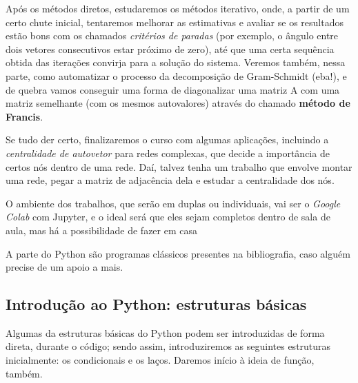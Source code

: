 \documentclass[../numerical_methods.tex]{subfiles}
\begin{document}
Após os métodos diretos, estudaremos os métodos iterativo, onde, a partir de um certo chute inicial, tentaremos melhorar as estimativas e avaliar se os resultados estão bons com os chamados \textit{critérios de paradas} (por exemplo, o ângulo entre dois vetores consecutivos estar próximo de zero), até que uma certa sequência obtida das iterações convirja para a solução do sistema.
Veremos também, nessa parte, como automatizar o processo da decomposição de Gram-Schmidt (eba!), e de quebra vamos conseguir uma forma de diagonalizar uma matriz A com uma matriz semelhante (com os mesmos autovalores) através do chamado \textbf{método de Francis}.

Se tudo der certo, finalizaremos o curso com algumas aplicações, incluindo a \textit{centralidade de autovetor} para redes complexas, que decide a importância de certos nós dentro de uma rede.
Daí, talvez tenha um trabalho que envolve montar uma rede, pegar a matriz de adjacência dela e estudar a centralidade dos nós.

O ambiente dos trabalhos, que serão em duplas ou individuais, vai ser o \textit{Google Colab} com Jupyter, e o ideal será que eles sejam completos dentro de sala de aula, mas há a possibilidade de fazer em casa

A parte do Python são programas clássicos presentes na bibliografia, caso alguém precise de um apoio a mais.

\subsection{Introdução ao Python: estruturas básicas}
Algumas da estruturas básicas do Python podem ser introduzidas de forma direta, durante o código; sendo assim, introduziremos as seguintes estruturas inicialmente: os condicionais e os laços. Daremos início à ideia de função, também.
\end{document}
